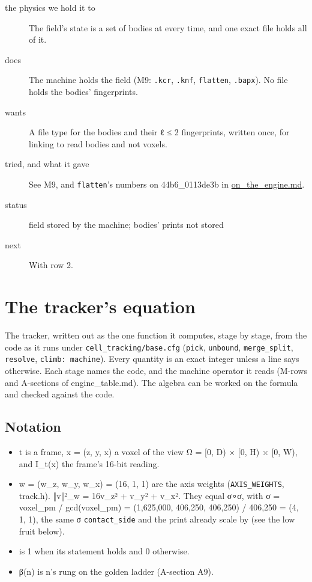 \begin{description}
\item[{the physics we hold it to}] The field's state is a set of bodies at every time, and one exact file holds all of it.
\item[{does}] The machine holds the field (M9: \texttt{.\allowbreak{}kcr}, \texttt{.\allowbreak{}knf}, \texttt{flatten}, \texttt{.\allowbreak{}bapx}). No file holds the bodies' fingerprints.
\item[{wants}] A file type for the bodies and their ℓ ≤ 2 fingerprints, written once, for linking to read bodies and not voxels.
\item[{tried, and what it gave}] See M9, and \texttt{flatten}'s numbers on 44b6\_\allowbreak{}0113de3b in \hyperref[chap:on-the-engine]{on\_\allowbreak{}the\_\allowbreak{}engine.md}.
\item[{status}] field stored by the machine; bodies' prints not stored
\item[{next}] With row 2.
\end{description}

\section{\texorpdfstring{The tracker's equation}{The tracker's equation}}

The tracker, written out as the one function it computes, stage by stage, from the code as it runs under \texttt{cell\_\allowbreak{}tracking/\allowbreak{}base.\allowbreak{}cfg} (\texttt{pick}, \texttt{unbound}, \texttt{merge\_\allowbreak{}split}, \texttt{resolve}, \texttt{climb: machine}). Every quantity is an exact integer unless a line says otherwise. Each stage names the code, and the machine operator it reads (M-rows and A-sections of engine\_\allowbreak{}table.md). The algebra can be worked on the formula and checked against the code.

\subsection{\texorpdfstring{Notation}{Notation}}

\begin{itemize}
\item t is a frame, x = (z, y, x) a voxel of the view Ω = [0, D) × [0, H) × [0, W), and I\_\allowbreak{}t(x) the frame's 16-bit reading.
\item w = (w\_\allowbreak{}z, w\_\allowbreak{}y, w\_\allowbreak{}x) = (16, 1, 1) are the axis weights (\texttt{AXIS\_\allowbreak{}WEIGHTS}, track.h). ‖v‖²\_\allowbreak{}w = 16v\_\allowbreak{}z² + v\_\allowbreak{}y² + v\_\allowbreak{}x². They equal σ∘σ, with σ = voxel\_\allowbreak{}pm / gcd(voxel\_\allowbreak{}pm) = (1,625,000, 406,250, 406,250) / 406,250 = (4, 1, 1), the same σ \texttt{contact\_\allowbreak{}side} and the print already scale by (see the low fruit below).
\item [·] is 1 when its statement holds and 0 otherwise.
\item β(n) is n's rung on the golden ladder (A-section A9).
\end{itemize}

